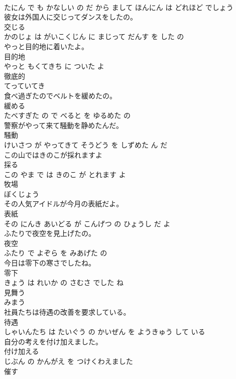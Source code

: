 \documentclass[8pt]{extreport}
\begin{document}
\begin{CJK}{UTF8}{min}
\\	たにん で も かなしい の だ から まして ほんにん は どれほど でしょう			
\\	彼女は外国人に交じってダンスをしたの。	
\\	交じる 
\\	かのじょ は がいこくじん に まじって だんす を した の			
\\	やっと目的地に着いたよ。	
\\	目的地 
\\	やっと もくてきち に ついた よ			
\\	徹底的	
\\	てっていてき		
\\	食べ過ぎたのでベルトを緩めたの。	
\\	緩める 
\\	たべすぎた の で べると を ゆるめた の			
\\	警察がやって来て騒動を静めたんだ。	
\\	騒動 
\\	けいさつ が やってきて そうどう を しずめた ん だ			
\\	この山ではきのこが採れますよ	
\\	採る 
\\	この やま で は きのこ が とれます よ			
\\	牧場	
\\	ぼくじょう		
\\	その人気アイドルが今月の表紙だよ。	
\\	表紙 
\\	その にんき あいどる が こんげつ の ひょうし だ よ			
\\	ふたりで夜空を見上げたの。	
\\	夜空 
\\	ふたり で よぞら を みあげた の			
\\	今日は零下の寒さでしたね。	
\\	零下 
\\	きょう は れいか の さむさ でした ね			
\\	見舞う	
\\	みまう		
\\	社員たちは待遇の改善を要求している。	
\\	待遇 
\\	しゃいんたち は たいぐう の かいぜん を ようきゅう して いる			
\\	自分の考えを付け加えました。	
\\	付け加える 
\\	じぶん の かんがえ を つけくわえました			
\\	催す	

\end{CJK}
\end{document}
